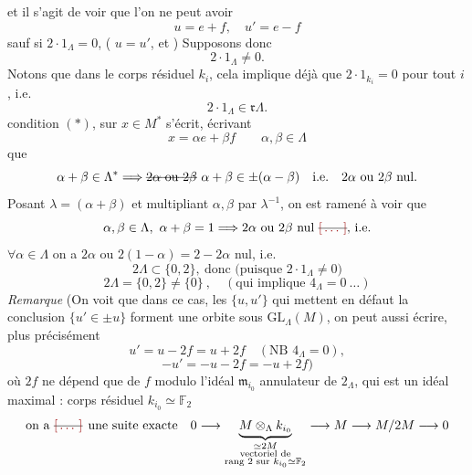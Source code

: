 \documentclass[11pt,a4paper]{article}
\begin{document}
et il s'agit de voir que l'on ne peut avoir
\[
u=e+f,\quad u'=e-f
\]
sauf  si $2\cdot1_\Lambda=0$, ( 
$u=u'$, et \struck{\ill{}})  Supposons donc
\[
2\cdot1_\Lambda\neq0 .
\]
Notons que  
dans le corps résiduel $k_i$, cela implique déjà que $2\cdot1_{k_i}=0$ pour tout $i$, i.e.
\[
2\cdot1_\Lambda\in\mathfrak{r}\Lambda .
\]
 condition $(*)$, sur $x\in M^{*}$ s'écrit, écrivant
\[
x=\alpha e+\beta f\qquad \alpha,\beta\in\Lambda
\]
que
\[
\alpha+\beta\in\Lambda^{*}\Longrightarrow \text{\struck{$2\alpha$ ou $2\beta$}}\ \alpha+\beta\in\pm(\alpha-\beta)
\quad\text{i.e.}\quad 2\alpha \text{ ou } 2\beta \text{ nul.}
\]
Posant $\lambda=(\alpha+\beta)$ et multipliant $\alpha,\beta$ par $\lambda^{-1}$, on est ramené à voir que
\[
\alpha,\beta\in\Lambda,\ \alpha+\beta=1\Longrightarrow 2\alpha \text{ ou } 2\beta \text{ nul \struck{\ill{}}, i.e.}
\]
$\forall\alpha\in\Lambda$ on a $2\alpha$ ou $2(1-\alpha)=2-2\alpha$ nul, i.e.
\[
2\Lambda\subset\{0,2\},\ \text{donc (puisque } 2\cdot1_\Lambda\neq0)
\]
\[
\boxed{2\Lambda=\{0,2\}\neq\{0\}}\ ,\quad (\text{qui implique } 4_\Lambda=0\ \ldots)
\]
\emph{Remarque} (On voit que dans ce cas, les   $\{u,u'\}$ qui mettent
en défaut la conclusion $\{u'\in\pm u\}$ forment une orbite sous $\mathrm{GL}_\Lambda(M)$, \struck{\ill{}}
on peut aussi écrire, plus précisément
\[
u'=u-2f=u+2f\quad(\text{NB } 4_\Lambda=0),
\]
\[
-u'=-u-2f=-u+2f)
\]
où $2f$ ne dépend que de $f$ modulo l'idéal $\mathfrak{m}_{i_0}$ annulateur de $2_\Lambda$, qui est un
idéal maximal : corps résiduel $k_{i_0}\simeq\mathbb{F}_2$ 
\[
\text{on a \struck{\ill{}} une suite exacte}\quad
0\longrightarrow\underbrace{M\otimes_\Lambda k_{i_0}}_{\substack{\simeq 2M\\ \text{vectoriel de}\\ \text{rang 2 sur } k_{i_0}\simeq\mathbb{F}_2}}\longrightarrow M\longrightarrow M/2M\longrightarrow 0
\]
\end{document}
